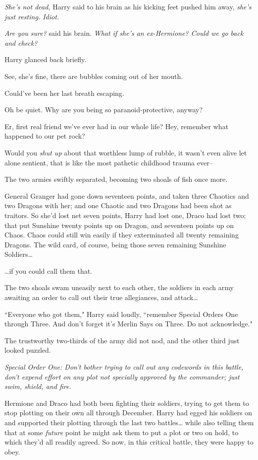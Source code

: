 \emph{She's not dead,} Harry said to his brain as his kicking feet pushed him away, \emph{she's just resting. \emph{Idiot.}}

\emph{Are you sure?} said his brain. \emph{What if she's an ex-Hermione? Could we go back and check?}

Harry glanced back briefly.

\begin{em}
See, she's fine, there are bubbles coming out of her mouth.

Could've been her last breath escaping.

Oh be quiet. Why are you being so paranoid-protective, anyway?

Er, first real friend we've ever had in our whole life? Hey, remember what happened to our pet rock?

Would you \emph{shut up} about that worthless lump of rubble, it wasn't even alive let alone sentient, that is like the most pathetic childhood trauma ever\---
\end{em}

The two armies swiftly separated, becoming two shoals of fish once more.

General Granger had gone down seventeen points, and taken three Chaotics and two Dragons with her; and one Chaotic and two Dragons had been shot as traitors. So she'd lost net seven points, Harry had lost one, Draco had lost two; that put Sunshine twenty points up on Dragon, and seventeen points up on Chaos. Chaos could still win easily if they exterminated all twenty remaining Dragons. The wild card, of course, being those seven remaining Sunshine Soldiers{\ldots}

{\ldots}if you could call them that.

The two shoals swam uneasily next to each other, the soldiers in each army awaiting an order to call out their true allegiances, and attack{\ldots}

``Everyone who got them," Harry said loudly, ``remember Special Orders One through Three. And don't forget it's Merlin Says on Three. Do not acknowledge."

The trustworthy two-thirds of the army did not nod, and the other third just looked puzzled.

\emph{Special Order One: Don't bother trying to call out any codewords in this battle, don't expend effort on any plot not specially approved by the commander; just swim, shield, and fire.}

Hermione and Draco had both been fighting their soldiers, trying to get them to stop plotting on their own all through December. Harry had egged his soldiers on and supported their plotting through the last two battles{\ldots} while also telling them that at some \emph{future} point he might ask them to put a plot or two on hold, to which they'd all readily agreed. So now, in this critical battle, they were happy to obey.

